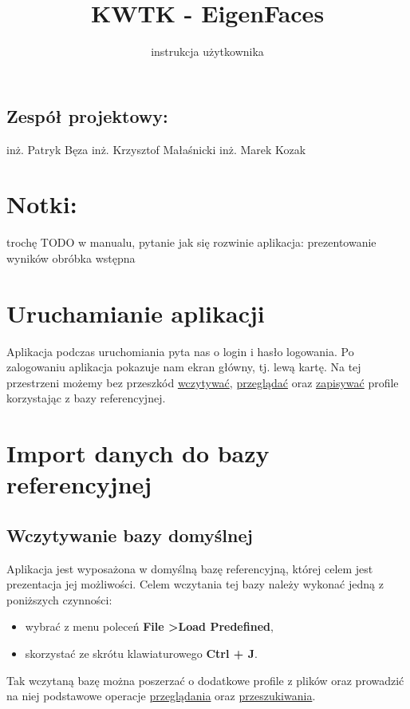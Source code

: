 \documentclass[]{article}
\title{KWTK - EigenFaces}
\author{instrukcja użytkownika}
\begin{document}
\maketitle


\subsection*{Zespół projektowy:}
	inż. Patryk Bęza \newline
	inż. Krzysztof Małaśnicki \newline
	inż. Marek Kozak
	
\section*{Notki:}
trochę TODO w manualu, pytanie jak się rozwinie aplikacja:\newline
prezentowanie wyników\newline
obróbka wstępna\newline

\newpage


\section[Uruchamianie]{Uruchamianie aplikacji}
\label{sec:run}
Aplikacja podczas uruchomiania pyta nas o login i hasło logowania.
Po zalogowaniu aplikacja pokazuje nam ekran główny, tj. lewą kartę. Na tej przestrzeni możemy bez przeszkód \hyperref[sec:load]{wczytywać}, \hyperref[sec:view]{przeglądać} oraz \hyperref[sec:save]{zapisywać} profile korzystając z bazy referencyjnej.


\section[Ładowanie bazy]{Import danych do bazy referencyjnej}
\label{sec:load}

\subsection{Wczytywanie bazy domyślnej}
Aplikacja jest wyposażona w domyślną bazę referencyjną, której celem jest prezentacja jej możliwości. Celem wczytania tej bazy należy wykonać jedną z poniższych czynności:
\begin{itemize}
\item wybrać z menu poleceń \textbf{File \textgreater \space Load Predefined},
\item skorzystać ze skrótu klawiaturowego \textbf{Ctrl + J}.
\end{itemize}
Tak wczytaną bazę można poszerzać o dodatkowe profile z plików oraz  prowadzić na niej podstawowe operacje \hyperref[sec:view]{przeglądania} oraz \hyperref[sec:query]{przeszukiwania}.
\end{document}
